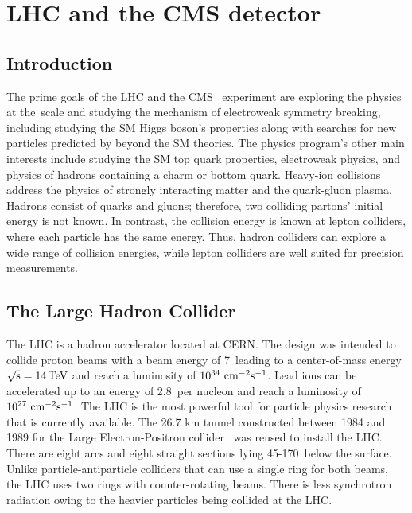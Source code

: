 %
%

\chapter{LHC and the CMS detector}
\label{experiment}

\section{Introduction}

The prime goals of the LHC and the CMS~\cite{Chatrchyan:2008aa} experiment are exploring the physics at the~\TeV scale and studying the mechanism of electroweak symmetry breaking, including studying the SM Higgs boson's properties along with searches for new particles predicted by beyond the SM theories. The physics program's other main interests include studying the SM top quark properties, electroweak physics, and physics of hadrons containing a charm or bottom quark. Heavy-ion collisions address the physics of strongly interacting matter and the quark-gluon plasma. Hadrons consist of quarks and gluons; therefore, two colliding partons' initial energy is not known. In contrast, the collision energy is known at lepton colliders, where each particle has the same energy. Thus, hadron colliders can explore a wide range of collision energies, while lepton colliders are well suited for precision measurements.

\section{The Large Hadron Collider}
\label{sec:LHC}

The LHC is a hadron accelerator located at CERN. The design was intended to collide proton beams with a beam energy of 7~\TeV leading to a center-of-mass energy $\sqrt{\text{s}} = 14 \,\text{Te\hspace{-.08em}V}$ and reach a luminosity of $10^{34}~\text{cm}^{-2}\text{s}^{-1}$. Lead ions can be accelerated up to an energy of 2.8~\TeV per nucleon and reach a luminosity of $10^{27}~\text{cm}^{-2}\text{s}^{-1}$. The LHC is the most powerful tool for particle physics research that is currently available. The 26.7 km tunnel constructed between 1984 and 1989 for the Large Electron-Positron collider~\cite{Electron-Positron:1997351} was reused to install the LHC. There are eight arcs and eight straight sections lying 45-170~\m below the surface. Unlike particle-antiparticle colliders that can use a single ring for both beams, the LHC uses two rings with counter-rotating beams. There is less synchrotron radiation owing to the heavier particles being collided at the LHC.

